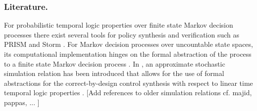 \documentclass{ifacconf}
\newcommand{\red}[1]{{\color{red} #1}}
\begin{document}
\subsubsection{Literature.}For probabilistic temporal logic properties  over finite state Markov decision processes %
there exist several tools for policy synthesis and verification such as PRISM \citep{KNP11} and  Storm \citep{dehnert2017storm}. 
	For Markov decision processes over uncountable state spaces,  its computational implementation  hinges on the formal abstraction of the process to a finite state Markov decision process \citep{soudjani2015faust}.  In \citep{haesaert2017verification}, an approximate stochastic simulation relation has been introduced that allows for the use of  formal abstractions for the correct-by-design control synthesis with respect to linear time temporal logic properties \citep{tech_report_TACAS}.  \red{[Add references to older simulation relations cf. majid, pappas, ... ]}

\end{document}

